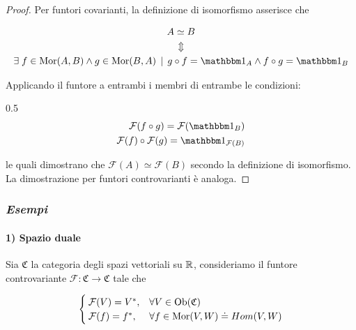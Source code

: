 \begin{proof}
	Per funtori covarianti, la definizione di isomorfismo asserisce che
	
	\begin{gather}
		A \simeq B \nonumber \\
		\Updownarrow \\ %
		\E f \in \mor(A,B) \wedge g \in \mor(B,A) \, \mid \, g \circ f = \bigone_{A} \wedge f \circ g = \bigone_{B} \nonumber
	\end{gather}
	
	Applicando il funtore a entrambi i membri di entrambe le condizioni:
	
		{0.5}{%
				\begin{align}
					\begin{split}
						\mathcal{F}(f \circ g) = \mathcal{F}(\bigone_{B}) \\
						\mathcal{F}(f) \circ \mathcal{F}(g) = \bigone_{\mathcal{F}(B)}
					\end{split}
				\end{align}
				}
	
	le quali dimostrano che $ \mathcal{F}(A) \simeq \mathcal{F}(B) $ secondo la definizione di isomorfismo. \\
	La dimostrazione per funtori controvarianti è analoga.
\end{proof}

\subsubsection{\textit{Esempi}}

\paragraph{1) Spazio duale}

Sia $ \mathfrak{C} $ la categoria degli spazi vettoriali su $ \mathbb{R} $, consideriamo il funtore controvariante $ \mathcal{F} : \mathfrak{C} \to \mathfrak{C} $ tale che

\begin{equation}
	\begin{cases}
		\mathcal{F}(V) = V^{*}, & \forall V \in \operatorname{Ob}(\mathfrak{C}) \\
		\mathcal{F}(f) = f^{*}, & \forall f \in \operatorname{Mor}(V,W) \doteq Hom(V,W)
	\end{cases}
\end{equation}

